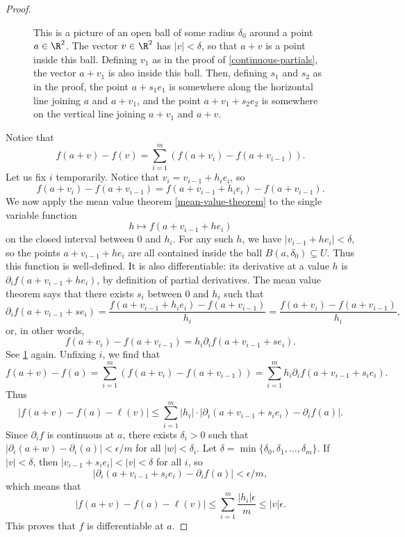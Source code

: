 \begin{proof}
\begin{figure}
\begin{center}
		\end{center}
		\caption{This is a picture of an open ball of some radius $\delta_0$ around a point $a \in \R^2$. The vector $v \in \R^2$ has $|v| < \delta$, so that $a+v$ is a point inside this ball. Defining $v_1$ as in the proof of \cref{continuous-partials}, the vector $a+v_1$ is also inside this ball. Then, defining $s_1$ and $s_2$ as in the proof, the point $a + s_1e_1$ is somewhere along the horizontal line joining $a$ and $a+v_1$, and the point $a+v_1 + s_2e_2$ is somewhere on the vertical line joining $a+v_1$ and $a+v$.}  \label{continuous-differentiability-picture}
	\end{figure}
	
	Notice that 
	\[ f(a+v) - f(v) = \sum_{i = 1}^m \left( f(a+v_i) - f(a+v_{i-1}) \right). \]
	Let us fix $i$ temporarily. Notice that $v_i = v_{i-1} + h_i e_i$, so
	\[ f(a+v_i) - f(a+v_{i-1}) = f(a+v_{i-1}+h_ie_i) - f(a+v_{i-1}). \]
	We now apply the mean value theorem \ref{mean-value-theorem} to the single variable function \[ h \mapsto f(a + v_{i-1} + he_i) \] on the closed interval between $0$ and $h_i$. For any such $h$, we have $|v_{i-1}+he_i| < \delta$, so the points $a+v_{i-1}+he_i$ are all contained inside the ball $B(a, \delta_0) \subseteq U$. Thus this function is well-defined. It is also differentiable: its derivative at a value $h$ is $\partial_i f(a+v_{i-1} + he_i)$, by definition of partial derivatives. The mean value theorem says that there exists $s_i$ between 0 and $h_i$ such that
	\[ \partial_i f(a+v_{i-1} + se_i) = \frac{f(a+v_{i-1} + h_ie_i) - f(a+v_{i-1})}{h_i} = \frac{f(a+v_{i}) - f(a + v_{i-1})}{h_i}, \]
	or, in other words,
	\[ f(a + v_i) - f(a+v_{i-1}) = h_i \partial_i f(a+v_{i-1} + se_i). \]
	See \cref{continuous-differentiability-picture} again. Unfixing $i$, we find that
	\[ f(a+v) - f(a) = \sum_{i = 1}^m (f(a+v_i) - f(a+v_{i-1})) = \sum_{i = 1}^m h_i \partial_i f(a+v_{i-1} + s_i e_i). \]
	Thus
	\[ |f(a+v) - f(a)-\ell(v)| \leq \sum_{i = 1}^m |h_i| \cdot |\partial_i(a+v_{i-1}+s_ie_i) - \partial_if(a)|. \]
	Since $\partial_if$ is continuous at $a$, there exists $\delta_i > 0$ such that $|\partial_i(a+w) - \partial_i(a)| < \epsilon/m$ for all $|w| < \delta_i$. Let $\delta = \min\{\delta_0, \delta_1, \dotsc, \delta_m\}$. If $|v| < \delta$, then $|v_{i-1} + s_ie_i| < |v| < \delta$ for all $i$, so
	\[ |\partial_i(a+v_{i-1} + s_ie_i) - \partial_i f(a)| < \epsilon/m, \]
	which means that
	\[ |f(a+v) - f(a)-\ell(v)| \leq \sum_{i = 1}^m \frac{|h_i| \epsilon}{m} \leq |v|\epsilon. \]
	This proves that $f$ is differentiable at $a$. 
\end{proof}

